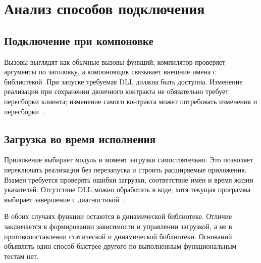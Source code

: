 \section{Анализ способов подключения}
\subsection{Подключение при компоновке}
Вызовы выглядят как обычные вызовы функций; компилятор проверяет аргументы по заголовку, а компоновщик связывает внешние имена с библиотекой. При запуске требуемая DLL должна быть доступна. Изменение реализации при сохранении двоичного контракта не обязательно требует пересборки клиента; изменение самого контракта может потребовать изменения и пересборки~\cite{loadtime}.

\subsection{Загрузка во время исполнения}
Приложение выбирает модуль и момент загрузки самостоятельно. Это позволяет переключать реализации без перезапуска и строить расширяемые приложения. Взамен требуется проверять ошибки загрузки, соответствие имён и время жизни указателей. Отсутствие DLL можно обработать в коде, хотя текущая программа выбирает завершение с диагностикой~\cite{runtime}.

В обоих случаях функции остаются в динамической библиотеке. Отличие заключается в формировании зависимости и управлении загрузкой, а не в противопоставлении статической и динамической библиотеки. Оснований объявлять один способ быстрее другого по выполненным функциональным тестам нет.
